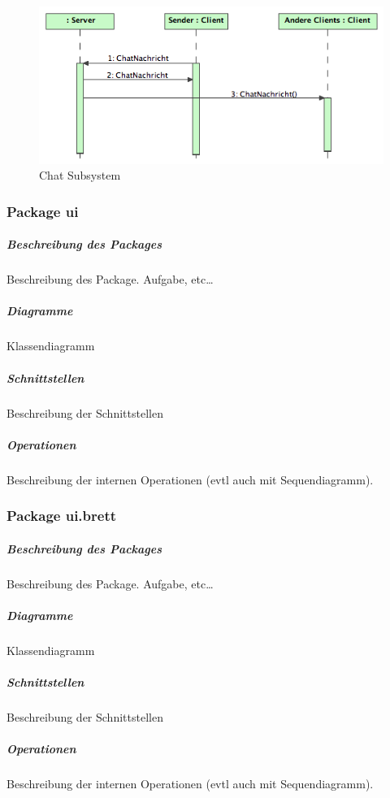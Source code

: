 \documentclass[a4paper,12pt,halfparskip,DIV14]{scrartcl}
\begin{document}
\begin{figure}
	[htp] \centering 
	\includegraphics[width=1\textwidth]{dienste_chat.png} \caption{Chat Subsystem}\label{fig:dienste_chat.png} 
\end{figure}

\newpage
\subsubsection{Package ui} %
\label{ssub:package_ui}
\subparagraph{Beschreibung des Packages} %
\label{ssub:beschreibung_des_packages}
Beschreibung des Package. Aufgabe, etc…
\subparagraph{Diagramme} %
\label{ssub:diagramme}
Klassendiagramm
\subparagraph{Schnittstellen} %
\label{ssub:schnittstellen}
Beschreibung der Schnittstellen
\subparagraph{Operationen} %
\label{ssub:operationen}
Beschreibung der internen Operationen (evtl auch mit Sequendiagramm).

\newpage
\subsubsection{Package ui.brett} %
\label{ssub:package_ui_brett}
\subparagraph{Beschreibung des Packages} %
\label{ssub:beschreibung_des_packages}
Beschreibung des Package. Aufgabe, etc…
\subparagraph{Diagramme} %
\label{ssub:diagramme}
Klassendiagramm
\subparagraph{Schnittstellen} %
\label{ssub:schnittstellen}
Beschreibung der Schnittstellen
\subparagraph{Operationen} %
\label{ssub:operationen}
Beschreibung der internen Operationen (evtl auch mit Sequendiagramm).
\end{document}
